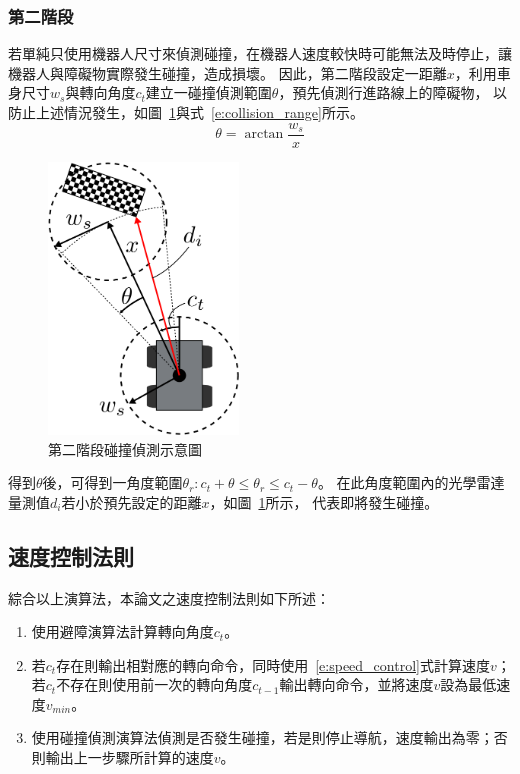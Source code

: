 \subsubsection{第二階段}
若單純只使用機器人尺寸來偵測碰撞，在機器人速度較快時可能無法及時停止，讓機器人與障礙物實際發生碰撞，造成損壞。
因此，第二階段設定一距離$x$，利用車身尺寸$w_s$與轉向角度$c_t$建立一碰撞偵測範圍$\theta$，預先偵測行進路線上的障礙物，
以防止上述情況發生，如圖~\ref{f:collision_2stage}與式~\ref{e:collision_range}所示。
\begin{equation}
	\theta = \arctan{\frac{w_s}{x}}
	\label{e:collision_range}
\end{equation}
\begin{figure}[h!]
	\centering
	\includegraphics[width=0.45\textwidth]{figures/collision_2stage}
	\caption{第二階段碰撞偵測示意圖}
	\label{f:collision_2stage}
\end{figure}

得到$\theta$後，可得到一角度範圍$\theta_r : c_t + \theta \leq \theta_r \leq c_t - \theta$。
在此角度範圍內的光學雷達量測值$d_i$若小於預先設定的距離$x$，如圖~\ref{f:collision_2stage}所示，
代表即將發生碰撞。

\subsection{速度控制法則}
綜合以上演算法，本論文之速度控制法則如下所述：
\begin{enumerate}
	\item 使用避障演算法計算轉向角度$c_t$。
	\item 若$c_t$存在則輸出相對應的轉向命令，同時使用~\ref{e:speed_control}式計算速度$v$；
		若$c_t$不存在則使用前一次的轉向角度$c_{t-1}$輸出轉向命令，並將速度$v$設為最低速度$v_{min}$。
	\item 使用碰撞偵測演算法偵測是否發生碰撞，若是則停止導航，速度輸出為零；否則輸出上一步驟所計算的速度$v$。
\end{enumerate}


